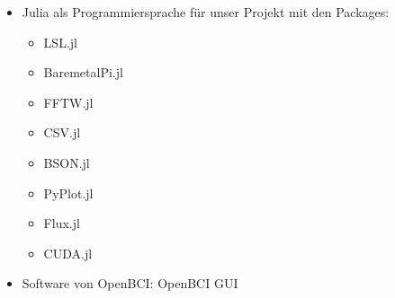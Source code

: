 \documentclass[10pt]{article}
\begin{document}
\begin{itemize}
\begin{multicols}{3}
    \begin{itemize}
        \item CPU: i7-11800H
        \item GPU: RTX 3060
        \item RAM: 64\,GB
    \end{itemize}
    \end{multicols}
    \vspace*{-2ex}
    \item Julia als Programmiersprache für unser Projekt mit den Packages:
    \vspace*{-2ex}
    \begin{multicols}{4}
    \begin{itemize}
        \item LSL.jl
        \item BaremetalPi.jl
        \item FFTW.jl
        \item CSV.jl
        \item BSON.jl
        \item PyPlot.jl
        \item Flux.jl
        \item CUDA.jl
    \end{itemize}
    \end{multicols}
    \vspace*{-2ex}
    \item Software von OpenBCI: OpenBCI GUI
    

\end{itemize}
\end{document}

